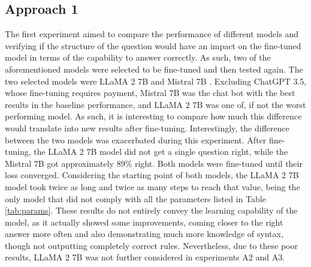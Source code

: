 \documentclass[sigconf]{acmart}
\begin{document}
\subsection{Approach 1}
The first experiment aimed to compare the performance of different models and verifying if the structure of the question would have an impact on the fine-tuned model in terms of the capability to answer correctly. As such, two of the aforementioned models were selected to be fine-tuned and then tested again. The two selected models were LLaMA 2 7B \cite{Touvron23} and Mistral 7B \cite{Jiang23}. Excluding ChatGPT 3.5, whose fine-tuning requires payment, Mistral 7B was the chat bot with the best results in the baseline performance, and LLaMA 2 7B was one of, if not the worst performing model. As such, it is interesting to compare how much this difference would translate into new results after fine-tuning. Interestingly, the difference between the two models was exacerbated during this experiment. After fine-tuning, the LLaMA 2 7B model did not get a single question right, while the Mistral 7B got approximately 89\% right. Both models were fine-tuned until their loss converged. Considering the starting point of both models, the LLaMA 2 7B model took twice as long and twice as many steps to reach that value, being the only model that did not comply with all the parameters listed in Table \ref{tab:params}. These results do not entirely convey the learning capability of the model, as it actually showed some improvements, coming closer to the right answer more often and also demonstrating much more knowledge of syntax, though not outputting completely correct rules. Nevertheless, due to these poor results, LLaMA 2 7B was not further considered in experiments A2 and A3.
\end{document}
